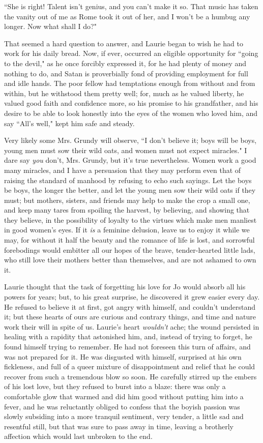 ``She is right! Talent isn't genius, and you
can't make it so. That music has taken the vanity out of
me as Rome took it out of her, and I won't be a humbug
any longer. Now what shall I do?"

That seemed a hard question to answer, and Laurie began to wish he had
to work for his daily bread. Now, if ever, occurred an eligible
opportunity for ``going to the devil," as he once forcibly expressed it,
for he had plenty of money and nothing to do, and Satan is proverbially
fond of providing employment for full and idle hands. The poor fellow
had temptations enough from without and from within, but he withstood
them pretty well; for, much as he valued liberty, he valued good faith
and confidence more, so his promise to his grandfather, and his desire
to be able to look honestly into the eyes of the women who loved him,
and say ``All's well," kept him safe and steady.

Very likely some Mrs. Grundy will observe, ``I don't
believe it; boys will be boys, young men must sow their wild oats, and
women must not expect miracles." I dare say \emph{you}
don't, Mrs. Grundy, but it's true
nevertheless. Women work a good many miracles, and I have a persuasion
that they may perform even that of raising the standard of manhood by
refusing to echo such sayings. Let the boys be boys, the longer the
better, and let the young men sow their wild oats if they must; but
mothers, sisters, and friends may help to make the crop a small one, and
keep many tares from spoiling the harvest, by believing, and showing
that they believe, in the possibility of loyalty to the virtues which
make men manliest in good women's eyes. If it \emph{is}
a feminine delusion, leave us to enjoy it while we may, for without it
half the beauty and the romance of life is lost, and sorrowful
forebodings would embitter all our hopes of the brave, tender-hearted
little lads, who still love their mothers better than themselves, and
are not ashamed to own it.

Laurie thought that the task of forgetting his love for Jo would absorb
all his powers for years; but, to his great surprise, he discovered it
grew easier every day. He refused to believe it at first, got angry with
himself, and couldn't understand it; but these hearts of
ours are curious and contrary things, and time and nature work their
will in spite of us. Laurie's heart
\emph{wouldn't} ache; the wound persisted in healing
with a rapidity that astonished him, and, instead of trying to forget,
he found himself trying to remember. He had not foreseen this turn of
affairs, and was not prepared for it. He was disgusted with himself,
surprised at his own fickleness, and full of a queer mixture of
disappointment and relief that he could recover from such a tremendous
blow so soon. He carefully stirred up the embers of his lost love, but
they refused to burst into a blaze: there was only a comfortable glow
that warmed and did him good without putting him into a fever, and he
was reluctantly obliged to confess that the boyish passion was slowly
subsiding into a more tranquil sentiment, very tender, a little sad and
resentful still, but that was sure to pass away in time, leaving a
brotherly affection which would last unbroken to the end.

